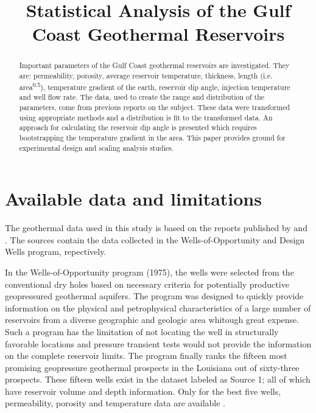 \documentclass[review,authoryear, 12pt]{elsarticle}\usepackage[]{graphicx}\usepackage[]{color}
\begin{document}
\begin{frontmatter}


\title{Statistical Analysis of the Gulf Coast Geothermal Reservoirs}

\begin{abstract}

Important parameters of the Gulf Coast geothermal reservoirs are investigated. They are: permeability, porosity, average reservoir temperature, thickness, length (i.e. area\textsuperscript{0.5}), temperature gradient of the earth, reservoir dip angle, injection temperature and well flow rate. The data, used to create the range and distribution of the parameters, come from previous reports on the subject. These data were transformed using appropriate methods and a distribution is fit to the transformed data. An approach for calculating the reservoir dip angle is presented which requires bootstrapping the temperature gradient in the area. This paper provides ground for experimental design and scaling analysis studies. 

\end{abstract}


\end{frontmatter}




\section{Available data and limitations}
The geothermal data used in this study is based on the reports published by    \citet{bassiouni1980evaluation} and \citet{john1998gulf}. The sources contain the data collected in the Wells-of-Opportunity  and Design Wells program, repectively. 
 
 
In the Wells-of-Opportunity program (1975), the wells were selected from the conventional dry holes based on necessary criteria for potentially productive geopressured geothermal aquifers. The program was designed to quickly provide information on the physical and petrophysical characteristics of a large number of reservoirs from a diverse geographic and geologic area whitough great expense. Such a program has the limitation of not locating the well in structurally favorable locations and pressure transient tests would not provide the information on the complete reservoir limits.  The program finally ranks the fifteen most promising geopressure geothermal prospects in the Louisiana out of sixty-three prospects. These fifteen wells exist in the dataset labeled as Source 1; all of which have reservoir volume and depth information. Only for the best five wells, permeability, porosity and temperature data are available \citep{bassiouni1980evaluation}. 
\end{document}
